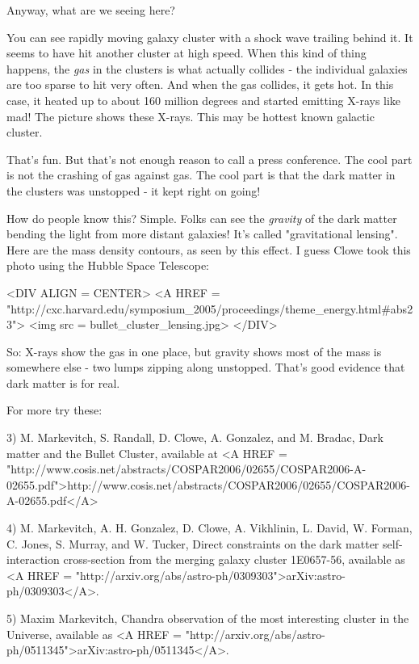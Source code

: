 Anyway, what are we seeing here?

You can see rapidly moving galaxy cluster with a shock wave trailing 
behind it.  It seems to have hit another cluster at high speed.
When this kind of thing happens, the \emph{gas} in 
the clusters is what actually collides - the individual galaxies are
too sparse to hit very often.  And when the gas collides, it gets hot.  
In this case, it heated up to about 160 million degrees and started 
emitting X-rays like mad!  The picture shows these X-rays.  This may 
be hottest known galactic cluster.    

That's fun.  But that's not enough reason to call a press conference.  The 
cool part is not the crashing of gas against gas.  The cool part is
that the dark matter in the clusters was unstopped - it kept right 
on going!

How do people know this?  Simple.  Folks can see the \emph{gravity} of 
the dark matter bending the light from more distant galaxies!
It's called "gravitational lensing".
Here are the mass density contours, as seen by this effect.  
I guess Clowe took this photo using the Hubble Space Telescope:

<DIV ALIGN = CENTER>
<A HREF = "http://cxc.harvard.edu/symposium_2005/proceedings/theme_energy.html#abs23">
<img src = bullet_cluster_lensing.jpg>
</DIV>


So: X-rays show the gas in one place, but gravity shows most of the mass 
is somewhere else - two lumps zipping along unstopped.
That's good evidence that dark matter is for real.


For more try these:

3) M. Markevitch, S. Randall, D. Clowe, A. Gonzalez, and M. Bradac,
Dark matter and the Bullet Cluster, available at 
<A HREF = "http://www.cosis.net/abstracts/COSPAR2006/02655/COSPAR2006-A-02655.pdf">http://www.cosis.net/abstracts/COSPAR2006/02655/COSPAR2006-A-02655.pdf</A>

4) M. Markevitch, A. H. Gonzalez, D. Clowe, A. Vikhlinin, L. David,
W. Forman, C. Jones, S. Murray, and W. Tucker, Direct constraints on
the dark matter self-interaction cross-section from the merging galaxy
cluster 1E0657-56, available as <A HREF =
"http://arxiv.org/abs/astro-ph/0309303">arXiv:astro-ph/0309303</A>.

5) Maxim Markevitch, Chandra observation of the most interesting
cluster in the Universe, available as <A HREF =
"http://arxiv.org/abs/astro-ph/0511345">arXiv:astro-ph/0511345</A>.

